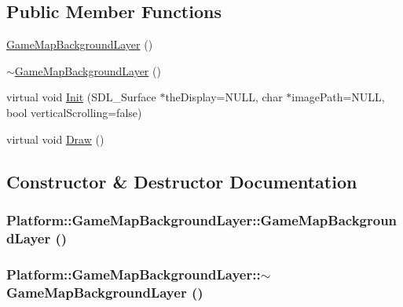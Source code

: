 \subsection*{Public Member Functions}
\begin{CompactItemize}
\item 
\hyperlink{class_platform_1_1_game_map_background_layer_16460906bb5c157b819a509d36492bbc}{GameMapBackgroundLayer} ()
\item 
\hyperlink{class_platform_1_1_game_map_background_layer_e2472fc42632246e23270264e568887a}{$\sim$GameMapBackgroundLayer} ()
\item 
virtual void \hyperlink{class_platform_1_1_game_map_background_layer_449a95c15187b1ae358a0216a589df3f}{Init} (SDL\_\-Surface $\ast$theDisplay=NULL, char $\ast$imagePath=NULL, bool verticalScrolling=false)
\item 
virtual void \hyperlink{class_platform_1_1_game_map_background_layer_f6910e7841ae5315baa5fd956202a982}{Draw} ()
\end{CompactItemize}


\subsection{Constructor \& Destructor Documentation}
\hypertarget{class_platform_1_1_game_map_background_layer_16460906bb5c157b819a509d36492bbc}{
\subsubsection[{GameMapBackgroundLayer}]{\setlength{\rightskip}{0pt plus 5cm}Platform::GameMapBackgroundLayer::GameMapBackgroundLayer ()}}
\label{df/d72/class_platform_1_1_game_map_background_layer_16460906bb5c157b819a509d36492bbc}


\hypertarget{class_platform_1_1_game_map_background_layer_e2472fc42632246e23270264e568887a}{
\subsubsection[{$\sim$GameMapBackgroundLayer}]{\setlength{\rightskip}{0pt plus 5cm}Platform::GameMapBackgroundLayer::$\sim$GameMapBackgroundLayer ()}}
\label{df/d72/class_platform_1_1_game_map_background_layer_e2472fc42632246e23270264e568887a}




